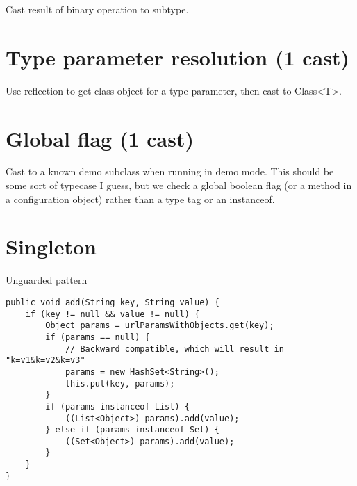 Cast result of binary operation to subtype. 

\section{Type parameter resolution (1 cast)}
\label{sec:org9cfdb15}

Use reflection to get class object for a type parameter, then cast to Class<T>. 

\section{Global flag (1 cast)}
\label{sec:orgcbf8be9}

Cast to a known demo subclass when running in demo mode. 
This should be some sort of typecase I guess, but we check a global boolean flag (or a method in a configuration object) rather than a type tag or an instanceof. 

\section{Singleton}
\label{sec:orgc67407e}
Unguarded pattern 

\lstset{language=java,label= ,caption= ,captionpos=b,numbers=none}
\begin{lstlisting}
public void add(String key, String value) { 
    if (key != null && value != null) { 
        Object params = urlParamsWithObjects.get(key); 
        if (params == null) { 
            // Backward compatible, which will result in "k=v1&k=v2&k=v3" 
            params = new HashSet<String>(); 
            this.put(key, params); 
        } 
        if (params instanceof List) { 
            ((List<Object>) params).add(value); 
        } else if (params instanceof Set) { 
            ((Set<Object>) params).add(value); 
        } 
    } 
} 
\end{lstlisting}
